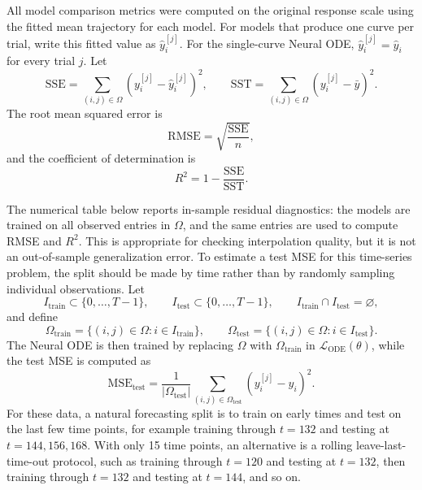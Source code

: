 All model comparison metrics were computed on the original response scale using
the fitted mean trajectory for each model. For models that produce one curve per
trial, write this fitted value as $\widehat y_i^{[j]}$. For the single-curve
Neural ODE, $\widehat y_i^{[j]}=\widehat y_i$ for every trial $j$. Let
$$
  \mathrm{SSE}
  =
  \sum_{(i,j)\in\Omega}(y_i^{[j]}-\widehat y_i^{[j]})^2,
  \qquad
  \mathrm{SST}
  =
  \sum_{(i,j)\in\Omega}(y_i^{[j]}-\bar y)^2.
$$
The root mean squared error is
$$
    \mathrm{RMSE}
    =
    \sqrt{\frac{\mathrm{SSE}}{n}},
$$
and the coefficient of determination is
$$
    R^2
    =
    1-\frac{\mathrm{SSE}}{\mathrm{SST}}.
$$

The numerical table below reports in-sample residual diagnostics: the models
are trained on all observed entries in $\Omega$, and the same entries are used
to compute RMSE and $R^2$. This is appropriate for checking interpolation
quality, but it is not an out-of-sample generalization error. To estimate a
test MSE for this time-series problem, the split should be made by time rather
than by randomly sampling individual observations. Let
$$
  I_{\mathrm{train}}\subset \{0,\ldots,T-1\},
  \qquad
  I_{\mathrm{test}}\subset \{0,\ldots,T-1\},
  \qquad
  I_{\mathrm{train}}\cap I_{\mathrm{test}}=\varnothing,
$$
and define
$$
  \Omega_{\mathrm{train}}
  =
  \{(i,j)\in\Omega:i\in I_{\mathrm{train}}\},
  \qquad
  \Omega_{\mathrm{test}}
  =
  \{(i,j)\in\Omega:i\in I_{\mathrm{test}}\}.
$$
The Neural ODE is then trained by replacing $\Omega$ with
$\Omega_{\mathrm{train}}$ in $\mathcal L_{\mathrm{ODE}}(\theta)$, while the test
MSE is computed as
$$
  \mathrm{MSE}_{\mathrm{test}}
  =
  \frac{1}{|\Omega_{\mathrm{test}}|}
  \sum_{(i,j)\in\Omega_{\mathrm{test}}}
  \left(y_i^{[j]}-\widehat y_i\right)^2.
$$
For these data, a natural forecasting split is to train on early times and test
on the last few time points, for example training through $t=132$ and testing
at $t=144,156,168$. With only 15 time points, an alternative is a rolling
leave-last-time-out protocol, such as training through $t=120$ and testing at
$t=132$, then training through $t=132$ and testing at $t=144$, and so on.

